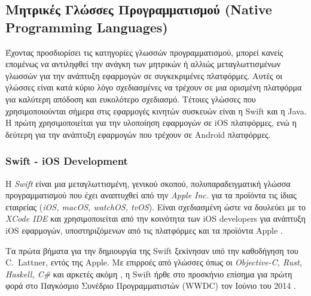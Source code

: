 \subsection{Μητρικές Γλώσσες Προγραμματισμού (Native Programming Languages)}
Έχοντας προσδιορίσει τις κατηγορίες γλωσσών προγραμματισμού, μπορεί κανείς επομένως να αντιληφθεί την ανάγκη των μητρικών ή αλλιώς μεταγλωττισμένων γλωσσών για την ανάπτυξη εφαρμογών σε συγκεκριμένες πλατφόρμες. Αυτές οι γλώσσες είναι κατά κύριο λόγο σχεδιασμένες να τρέχουν σε μια ορισμένη πλατφόρμα για καλύτερη απόδοση και ευκολότερο σχεδιασμό. Τέτοιες γλώσσες που χρησιμοποιούνται σήμερα στις εφαρμογές κινητών συσκευών είναι η Swift και η Java. Η πρώτη χρησιμοποιείται για την υλοποίηση εφαρμογών σε iOS πλατφόρμες, ενώ η δεύτερη για την ανάπτυξη εφαρμογών που τρέχουν σε Android πλατφόρμες.

\subsubsection{Swift - iOS Development}
Η \textit{Swift} είναι μια μεταγλωττισμένη, γενικού σκοπού, πολυπαραδειγματική γλώσσα προγραμματισμού που έχει αναπτυχθεί από την \textit{Apple Inc.} για τα προϊόντα τις ίδιας εταιρείας (\textit{iOS, macOS, watchOS, tvOS}). Είναι σχεδιασμένη ώστε να δουλεύει με το \textit{XCode IDE} και χρησιμοποιείται από την κοινότητα των iOS developers για ανάπτυξη iOS εφαρμογών, υποστηριζόμενων από τις πλατφόρμες και τα προϊόντα Apple \cite{[SWIFT1+16]}.

Τα πρώτα βήματα για την δημιουργία της Swift ξεκίνησαν υπό την καθοδήγηση του C.~Lattner, εντός της Apple. Με επιρροές από γλώσσες όπως οι \textit{Objective-C, Rust, Haskell, C\#} και αρκετές ακόμη \cite{[SWIFT2+14]}, η Swift ήρθε στο προσκήνιο επίσημα για πρώτη φορά στο Παγκόσμιο Συνέδριο Προγραμματιστών (WWDC) τον Ιούνιο του 2014 \cite{[SWIFT3+14]}. 

